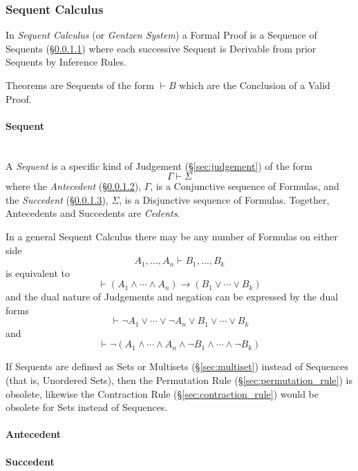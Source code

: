 \subsubsection{Sequent Calculus}\label{sec:sequent_calculus}

In \emph{Sequent Calculus} (or \emph{Gentzen System}) a Formal Proof
is a Sequence of Sequents (\S\ref{sec:sequent}) where each
successive Sequent is Derivable from prior Sequents by Inference
Rules.

Theorems are Sequents of the form $\vdash B$ which are the Conclusion
of a Valid Proof.



\paragraph{Sequent}\label{sec:sequent}
\hfill \\

A \emph{Sequent} is a specific kind of Judgement
(\S\ref{sec:judgement}) of the form
\[
  \Gamma \vdash \Sigma
\]
where the \emph{Antecedent} (\S\ref{sec:antecedent}), $\Gamma$, is a
Conjunctive sequence of Formulas, and the \emph{Succedent}
(\S\ref{sec:succedent}), $\Sigma$, is a Disjunctive sequence of
Formulas. Together, Antecedents and Succedents are \emph{Cedents}.

In a general Sequent Calculus there may be any number of Formulas on
either side
\[
  A_1, \ldots, A_n \vdash B_1, \ldots, B_k
\]
is equivalent to
\[
  \vdash(A_1 \wedge \cdots \wedge A_n) \rightarrow
  (B_1 \vee \cdots \vee B_k)
\]
and the dual nature of Judgements and negation can be expressed by the
dual forms
\[
  \vdash \neg A_1 \vee \cdots \vee \neg A_n \vee B_1 \vee \cdots
  \vee B_k
\]
and
\[
  \vdash \neg(A_1 \wedge \cdots \wedge A_n \wedge \neg B_1 \wedge
  \cdots \wedge \neg B_k)
\]

If Sequents are defined as Sets or Multisets (\S\ref{sec:multiset})
instead of Sequences (that is, Unordered Sets), then the Permutation
Rule (\S\ref{sec:permutation_rule}) is obsolete, likewise the
Contraction Rule (\S\ref{sec:contraction_rule}) would be obsolete for
Sets instead of Sequences.



\paragraph{Antecedent}\label{sec:antecedent}

\paragraph{Succedent}\label{sec:succedent}

